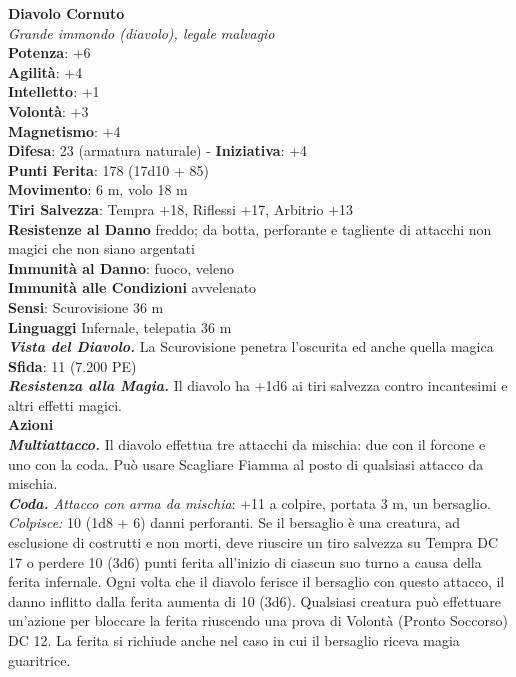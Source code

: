 \begin{multicols}{2}
\medskip\textbf{Diavolo Cornuto}\\
\emph{Grande immondo (diavolo), legale malvagio}\\
\textbf{Potenza}: +6\\
\textbf{Agilità}: +4\\
\textbf{Intelletto}: +1\\
\textbf{Volontà}: +3\\
\textbf{Magnetismo}: +4\\
\textbf{Difesa}: 23 (armatura naturale) - \textbf{Iniziativa}: +4\\
\textbf{Punti Ferita}: 178 (17d10 + 85)\\
\textbf{Movimento}: 6 m, volo 18 m\\
\textbf{Tiri Salvezza}: Tempra +18, Riflessi +17, Arbitrio +13\\
\textbf{Resistenze al Danno} freddo; da botta, perforante e tagliente di attacchi non magici che non siano argentati\\
\textbf{Immunità al Danno}: fuoco, veleno\\
\textbf{Immunità alle Condizioni} avvelenato\\
\textbf{Sensi}: Scurovisione 36 m\\
\textbf{Linguaggi} Infernale, telepatia 36 m \\
\emph{\textbf{Vista del Diavolo.}} La Scurovisione penetra l'oscurita ed anche quella magica\\
\textbf{Sfida}: 11 (7.200 PE)\smallskip\\
\emph{\textbf{Resistenza alla Magia.}} Il diavolo ha +1d6 ai tiri salvezza contro incantesimi e altri effetti magici.\\
\smallskip\textbf{Azioni}\\
\emph{\textbf{Multiattacco.}} Il diavolo effettua tre attacchi da mischia: due con il forcone e uno con la coda. Può usare Scagliare Fiamma al posto di qualsiasi attacco da mischia.\\
\emph{\textbf{Coda.} Attacco con arma da mischia}: +11 a colpire, portata 3 m, un bersaglio.\\
\emph{Colpisce:} 10 (1d8 + 6) danni perforanti. Se il bersaglio è una creatura, ad esclusione di costrutti e non morti, deve riuscire un tiro salvezza su Tempra DC 17 o perdere 10 (3d6) punti ferita all'inizio di ciascun suo turno a causa della ferita infernale. Ogni volta che il diavolo ferisce il bersaglio con questo attacco, il danno inflitto dalla ferita aumenta di 10 (3d6). Qualsiasi creatura può effettuare un'azione per bloccare la ferita riuscendo una prova di Volontà (Pronto Soccorso) DC 12. La ferita si richiude anche nel caso in cui il bersaglio riceva magia guaritrice.\\

\end{multicols}
